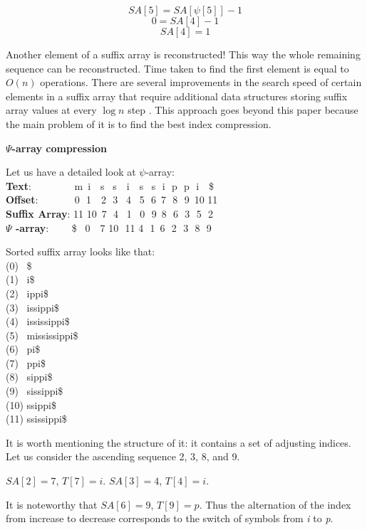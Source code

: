 \[SA[5] = SA[\psi[5]] - 1\]
\[0 = SA[4] - 1\]
\[SA[4] = 1\]

Another element of a suffix array is reconstructed!
This way the whole remaining sequence can be reconstructed.
Time taken to find the first element is equal to \(O(n)\) operations.
There are several improvements in the search speed of certain elements in a suffix array
that require additional data structures storing suffix array values at every \(\log n\) step \cite{andersensimple}.
This approach goes beyond this paper because the main problem of it is to find the best index compression.

\textbf{$\Psi$-array compression}

Let us have a detailed look at $\psi$-array:
\\ \textbf{Text}:\,\,\,\,\,\,\,\,\,\,\,\,\,\,\,\,\,\,\,\,\,\,\,\,
m \,i \,\,\,\,s \,\,\,s \,\,\,\,i \,\,\,\,s \,\,\,s \,\,i \,\,p \,\,p \,\,i \,\,\,\,\$
\\ \textbf{Offset}:\,\,\,\,\,\,\,\,\,\,\,\,\,\,\,\,\,\,\,\, 0 \,\,1 \,\,\,\,2
\,\,3 \,\,\,4 \,\,\,5 \,\,6 \,7 \,\,8 \,\,9 \,10 11
\\ \textbf{Suffix Array}:   11 10 \,7 \,\,4 \,\,\,1 \,\,\,0 \,\,9 \,8 \,\,6
\,\,3 \,\,5 \,\,2
\\ \textbf{$\Psi$ -array}: \,\,\,\,\,\,\,\,\,\,\,\,\$ \,\,\,0 \,\,\,\,7 10 \,\,11 4
\,\,1 \,6 \,\,2 \,\,3 \,\,8 \,\,9

Sorted suffix array looks like that:
\\ (0) \,\,\,\$
\\ (1) \,\,\,i\$
\\ (2) \,\,\,ippi\$
\\ (3) \,\,\,issippi\$
\\ (4) \,\,\,ississippi\$
\\ (5) \,\,\,mississippi\$
\\ (6) \,\,\,pi\$
\\ (7) \,\,\,ppi\$
\\ (8) \,\,\,sippi\$
\\ (9) \,\,\,sissippi\$
\\ (10) ssippi\$
\\ (11) ssissippi\$

It is worth mentioning the structure of it: it contains a set of adjusting indices.
Let us consider the ascending sequence 2, 3, 8, and 9.

$SA[2] = 7$, $T[7] = i$.
$SA[3] = 4$, $T[4] = i$.

It is noteworthy that $SA[6] = 9$, $T[9] = p$.
Thus the alternation of the index from increase to decrease corresponds to
the switch of symbols from \emph{i} to \emph{p}.

